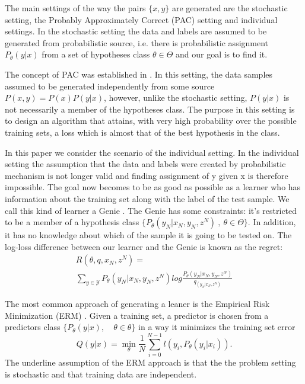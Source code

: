 \documentclass[letterpaper, 10 pt, conference]{ieeeconf}  %
\begin{document}
The main settings of the way the pairs $\{x,y\}$ are generated are the stochastic setting, the Probably Approximately Correct (PAC) setting and individual settings. In the stochastic setting the data and labels are assumed to be generated from probabilistic source, i.e. there is probabilistic assignment $P_\theta(y|x)$ from a set of hypotheses class $\theta \in \Theta$ and our goal is to find it. 

The concept of PAC was established in  \cite{valiant1984theory}.
In this setting, the data samples assumed to be generated independently from some source $P(x,y)=P(x)P(y|x)$, however, unlike the stochastic setting, $P(y|x)$ is not necessarily a member of the hypotheses class.
The purpose in this setting is to design an algorithm that attains, with very high probability over the possible training sets, a loss which is almost that of the best hypothesis in the class. 

In this paper we consider the scenario of the individual setting. 
In the individual setting the assumption that the data and labels were created by  probabilistic mechanism is not longer valid and finding assignment of y given x is therefore impossible. 
The goal now becomes to be as good as possible as a learner who has information about the training set along with the label of the test sample. 
We call this kind of learner a Genie \cite{feder1992universal}. The Genie has some constraints: it's restricted to be a member of a hypothesis class $\{P_\theta(y_N|x_N,y_N,z^N)\ , \ \theta \in \Theta \}$.  
In addition, it has no knowledge about which of the sample it is going to be tested on. 
The log-loss difference between our learner and the Genie is known as the regret:
\begin{multline} \label{eq:genie_regret}
R(\theta, q, x_N, z^N) = \\ \sum_{y \in \mathcal{Y}} P_\theta(y_N|x_N,y_N,z^N) log \frac{P_\theta(y_N|x_N,y_N,z^N)}{q_(y_N|x_N, z^N)} 
\end{multline}

The most common approach of generating a leaner is the Empirical Risk Minimization (ERM) \cite{vapnik1992principles}. Given a training set, a predictor is chosen from a predictors class $\{P_\theta(y|x) , \quad \theta \in \mathcal{\theta}\}$ in a way it minimizes the training set error 
\begin{equation}
Q(y|x) = \min_\theta \frac{1}{N}\sum_{i=0}^{N-1}  l(y_i,P_\theta(y_i|x_i)).
\end{equation}
The underline assumption of the ERM approach is that the the problem setting is stochastic and that training data are independent.
\end{document}
